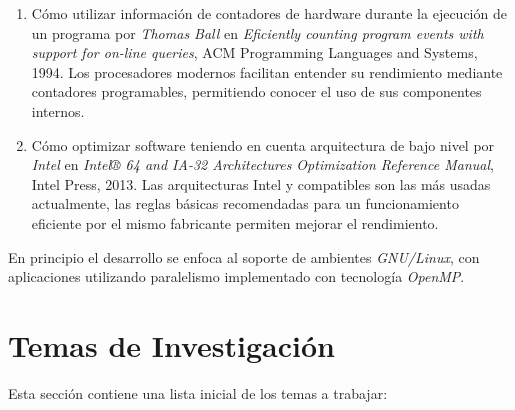 \documentclass[a4paper]{article}
\begin{document}
\begin{enumerate}
\item Cómo utilizar información de contadores de hardware durante la ejecución de un programa por {\it Thomas Ball} en {\it Eficiently counting program events with support for on-line queries}, ACM Programming Languages and Systems, 1994. Los procesadores modernos facilitan entender su rendimiento mediante contadores programables, permitiendo conocer el uso de sus componentes internos.

\item Cómo optimizar software teniendo en cuenta arquitectura de bajo nivel por {\it Intel} en {\it Intel® 64 and IA-32 Architectures Optimization Reference Manual}, Intel Press, 2013. Las arquitecturas Intel y compatibles son las más usadas actualmente, las reglas básicas recomendadas para un funcionamiento eficiente por el mismo fabricante permiten mejorar el rendimiento.

\end{enumerate}

En principio el desarrollo se enfoca al soporte de ambientes {\it GNU/Linux}, con aplicaciones utilizando paralelismo implementado con tecnología {\it OpenMP}.

\section{Temas de Investigación}

Esta sección contiene una lista inicial de los temas a trabajar:
\end{document}
